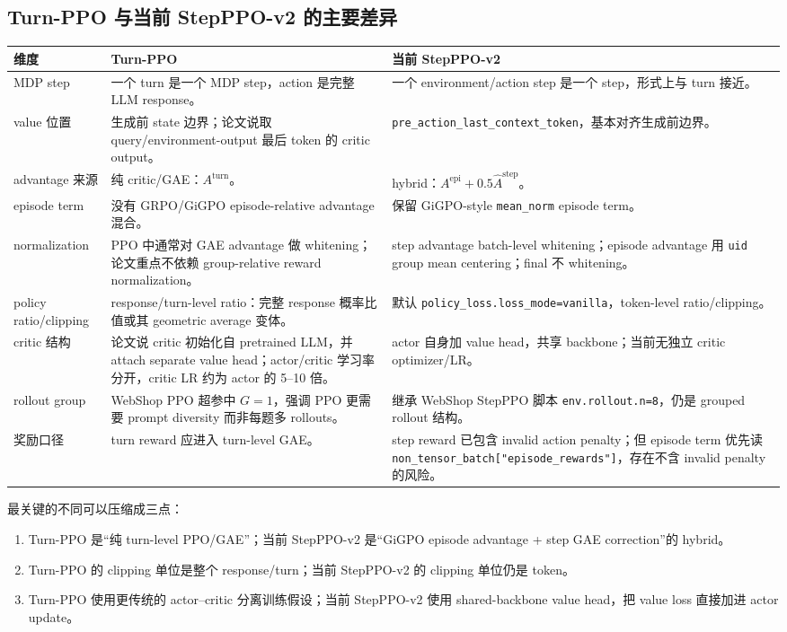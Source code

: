 \documentclass[10pt]{ctexart}
\newcommand{\code}[1]{\texttt{#1}}
\begin{document}
\subsection*{Turn-PPO 与当前 StepPPO-v2 的主要差异}
\begin{tabularx}{\textwidth}{p{}X X}
\toprule
维度 & Turn-PPO & 当前 StepPPO-v2 \\
\midrule
MDP step & 一个 turn 是一个 MDP step，action 是完整 LLM response。 & 一个 environment/action step 是一个 step，形式上与 turn 接近。 \\
value 位置 & 生成前 state 边界；论文说取 query/environment-output 最后 token 的 critic output。 & \code{pre\_action\_last\_context\_token}，基本对齐生成前边界。 \\
advantage 来源 & 纯 critic/GAE：$A^{\mathrm{turn}}$。 & hybrid：$A^{\mathrm{epi}}+0.5\widehat A^{\mathrm{step}}$。 \\
episode term & 没有 GRPO/GiGPO episode-relative advantage 混合。 & 保留 GiGPO-style \code{mean\_norm} episode term。 \\
normalization & PPO 中通常对 GAE advantage 做 whitening；论文重点不依赖 group-relative reward normalization。 & step advantage batch-level whitening；episode advantage 用 \code{uid} group mean centering；final 不 whitening。 \\
policy ratio/clipping & response/turn-level ratio：完整 response 概率比值或其 geometric average 变体。 & 默认 \code{policy\_loss.loss\_mode=vanilla}，token-level ratio/clipping。 \\
critic 结构 & 论文说 critic 初始化自 pretrained LLM，并 attach separate value head；actor/critic 学习率分开，critic LR 约为 actor 的 5--10 倍。 & actor 自身加 value head，共享 backbone；当前无独立 critic optimizer/LR。 \\
rollout group & WebShop PPO 超参中 $G=1$，强调 PPO 更需要 prompt diversity 而非每题多 rollouts。 & 继承 WebShop StepPPO 脚本 \code{env.rollout.n=8}，仍是 grouped rollout 结构。 \\
奖励口径 & turn reward 应进入 turn-level GAE。 & step reward 已包含 invalid action penalty；但 episode term 优先读 \code{non\_tensor\_batch["episode\_rewards"]}，存在不含 invalid penalty 的风险。 \\
\bottomrule
\end{tabularx}

最关键的不同可以压缩成三点：
\begin{enumerate}
  \item Turn-PPO 是“纯 turn-level PPO/GAE”；当前 StepPPO-v2 是“GiGPO episode advantage + step GAE correction”的 hybrid。
  \item Turn-PPO 的 clipping 单位是整个 response/turn；当前 StepPPO-v2 的 clipping 单位仍是 token。
  \item Turn-PPO 使用更传统的 actor--critic 分离训练假设；当前 StepPPO-v2 使用 shared-backbone value head，把 value loss 直接加进 actor update。
\end{enumerate}
\end{document}
